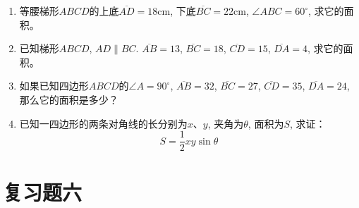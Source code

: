 \begin{enumerate}
\item  等腰梯形$ABCD$的上底$\overline{AD}=18$cm, 下底$\overline{BC}=22$cm, 
$\angle ABC=60^{\circ}$, 求它的面积。
\item 已知梯形$ABCD$, $AD\parallel BC$. $\overline{AB}=13$, $\overline{BC}=18$, 
$\overline{CD}=15$, $\overline{DA}=4$, 求它的面积。
\item 如果已知四边形$ABCD$的$\angle A=90^{\circ}$, $\overline{AB}=32$, $\overline{BC}=
27$, $\overline{CD}=35$, $\overline{DA}=24$, 那么它的面积是多少？
\item 已知一四边形的两条对角线的长分别为$x$、$y$, 夹角为$\theta$, 
面积为$S$, 求证：
\[S=\frac{1}{2}xy\sin\theta\]
\end{enumerate}

\section*{复习题六}
